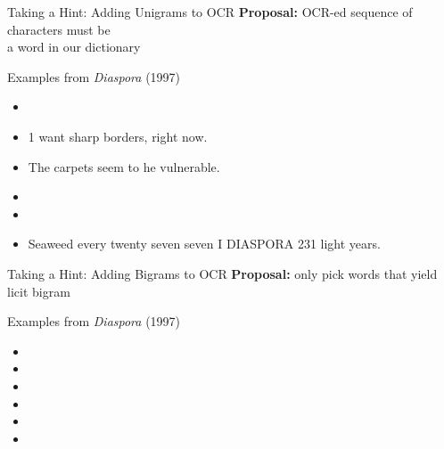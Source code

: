 \documentclass[professionalfonts, xcolor={usenames,svgnames,x11names,table}]{beamer}
\begin{document}
\begin{frame}{Taking a Hint: Adding Unigrams to OCR}
    \textbf{Proposal:} OCR-ed sequence of characters must be\\
    a word in our dictionary

    \begin{exampleblock}{Examples from \emph{Diaspora} (1997)}
        \begin{itemize}
            \item {}
            \item 1 want sharp borders, right now.
            \item The carpets seem to he vulnerable.
            \item {}
            \item {}
            \item Seaweed every twenty seven seven I DIASPORA 231 light years.
        \end{itemize}
    \end{exampleblock}
\end{frame}

\begin{frame}{Taking a Hint: Adding Bigrams to OCR}
    \textbf{Proposal:} only pick words that yield licit bigram
    
    \begin{exampleblock}{Examples from \emph{Diaspora} (1997)}
        \begin{itemize}
            \item {}
            \item {}
            \item {}
            \item {}
            \item {}
            \item {}
        \end{itemize}
    \end{exampleblock}
\end{frame}
\end{document}
